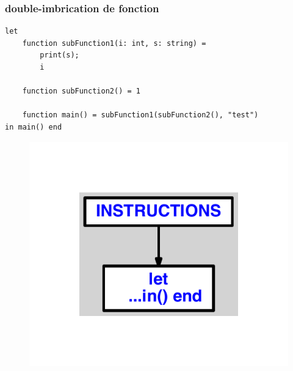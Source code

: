 \documentclass{article}
\begin{document}
\subsubsection{double-imbrication de fonction}
\begin{lstlisting}
let
	function subFunction1(i: int, s: string) =
		print(s);
		i

	function subFunction2() = 1

	function main() = subFunction1(subFunction2(), "test")
in main() end
\end{lstlisting}
\newpage
\begin{figure}[H]
\centering
\includegraphics[max width=\textwidth]{ast/ast_244.pdf}
\end{figure}
\newpage
\end{document}
